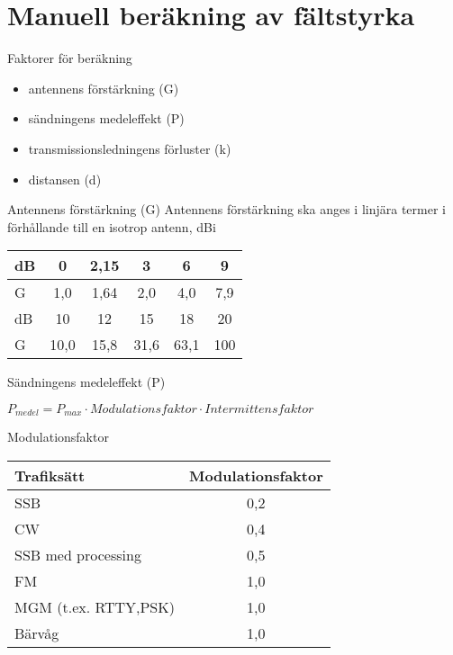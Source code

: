 \documentclass{beamer}
\begin{document}
\section{Manuell beräkning av fältstyrka}

\begin{frame}{Faktorer för beräkning}
\begin{itemize}
	\item antennens förstärkning (G)
	\item sändningens medeleffekt (P)
	\item transmissionsledningens förluster (k)
	\item distansen (d)
\end{itemize}
\end{frame}

\begin{frame}{Antennens förstärkning (G)}
Antennens förstärkning ska anges i linjära termer i förhållande till en isotrop
antenn, dBi

\begin{tabular}{|l|ccccc|}
	\hline
	dB     &  0  & 2,15 &  3  &  6  &  9  \\ \hline
	G & 1,0 & 1,64 & 2,0 & 4,0 & 7,9 \\ \hline
	dB     &  10  &  12  &  15  &  18  &  20 \\ \hline
	G & 10,0 & 15,8 & 31,6 & 63,1 & 100 \\ \hline
\end{tabular}
\end{frame}

\begin{frame}{Sändningens medeleffekt (P)}

\(P_{medel} = P_{max} \cdot Modulationsfaktor \cdot Intermittensfaktor\)
\end{frame}

\begin{frame}{Modulationsfaktor}
\begin{tabular}{|l|c|}
	\hline
	Trafiksätt & Modulationsfaktor \\ \hline
	SSB & 0,2 \\ \hline
	CW & 0,4 \\ \hline
	SSB med processing & 0,5 \\ \hline
	FM & 1,0 \\ \hline
	MGM (t.ex. RTTY,PSK) & 1,0 \\ \hline
	Bärvåg & 1,0 \\ \hline
\end{tabular}
\end{frame}
\end{document}
